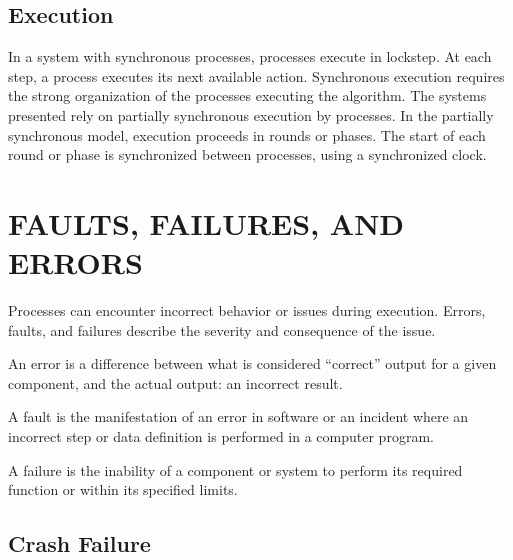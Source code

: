 \subsection{Execution}
In a system with synchronous processes, processes execute in lockstep.
At each step, a process executes its next available action.
Synchronous execution requires the strong organization of the processes executing the algorithm.
The systems presented rely on partially synchronous execution by processes.
In the partially synchronous model, execution proceeds in rounds or phases.
The start of each round or phase is synchronized between processes, using a synchronized clock.

\section{FAULTS, FAILURES, AND ERRORS}

Processes can encounter incorrect behavior or issues during execution.
Errors, faults, and failures describe the severity and consequence of the issue.

\begin{pdef}
An error is a difference between what is considered ``correct'' output for a given component, and the actual output: an incorrect result.
\end{pdef}

\begin{pdef}
A fault is the manifestation of an error in software or an incident where an incorrect step or data definition is performed in a computer program.
\end{pdef}

\begin{pdef}
A failure is the inability of a component or system to perform its required function or within its specified limits.
\end{pdef}

\subsection{Crash Failure}

